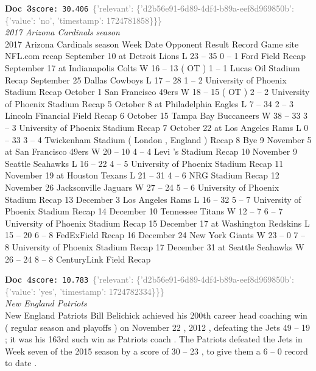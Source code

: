 \documentclass[a4paper,11pt]{article}
\begin{document}
\begin{docenv}
{\footnotesize\textcolor{doccolor}{\textbf{Doc~3}}}\hfill{\tiny\texttt{score:~30.406}}\ {\tiny\textcolor{gray}{\{'relevant': \{'d2b56e91-6d89-4df4-b89a-eef8d969850b': \{'value': 'no', 'timestamp': 1724781858\}\}\}}}\\[3pt]
{\small\textit{2017 Arizona Cardinals season}}\\[2pt]
\vspace{2pt}
{\footnotesize 2017 Arizona Cardinals season
Week Date Opponent Result Record Game site NFL.com recap September 10 at Detroit Lions L 23 -- 35 0 -- 1 Ford Field Recap September 17 at Indianapolis Colts W 16 -- 13 ( OT ) 1 -- 1 Lucas Oil Stadium Recap September 25 Dallas Cowboys L 17 -- 28 1 -- 2 University of Phoenix Stadium Recap October 1 San Francisco 49ers W 18 -- 15 ( OT ) 2 -- 2 University of Phoenix Stadium Recap 5 October 8 at Philadelphia Eagles L 7 -- 34 2 -- 3 Lincoln Financial Field Recap 6 October 15 Tampa Bay Buccaneers W 38 -- 33 3 -- 3 University of Phoenix Stadium Recap 7 October 22 at Los Angeles Rams L 0 -- 33 3 -- 4 Twickenham Stadium ( London , England ) Recap 8 Bye 9 November 5 at San Francisco 49ers W 20 -- 10 4 -- 4 Levi 's Stadium Recap 10 November 9 Seattle Seahawks L 16 -- 22 4 -- 5 University of Phoenix Stadium Recap 11 November 19 at Houston Texans L 21 -- 31 4 -- 6 NRG Stadium Recap 12 November 26 Jacksonville Jaguars W 27 -- 24 5 -- 6 University of Phoenix Stadium Recap 13 December 3 Los Angeles Rams L 16 -- 32 5 -- 7 University of Phoenix Stadium Recap 14 December 10 Tennessee Titans W 12 -- 7 6 -- 7 University of Phoenix Stadium Recap 15 December 17 at Washington Redskins L 15 -- 20 6 -- 8 FedExField Recap 16 December 24 New York Giants W 23 -- 0 7 -- 8 University of Phoenix Stadium Recap 17 December 31 at Seattle Seahawks W 26 -- 24 8 -- 8 CenturyLink Field Recap}
\end{docenv}
\begin{docenv}
{\footnotesize\textcolor{doccolor}{\textbf{Doc~4}}}\hfill{\tiny\texttt{score:~10.783}}\ {\tiny\textcolor{gray}{\{'relevant': \{'d2b56e91-6d89-4df4-b89a-eef8d969850b': \{'value': 'yes', 'timestamp': 1724782334\}\}\}}}\\[3pt]
{\small\textit{New England Patriots}}\\[2pt]
\vspace{2pt}
{\footnotesize New England Patriots
Bill Belichick achieved his 200th career head coaching win ( regular season and playoffs ) on November 22 , 2012 , defeating the Jets 49 -- 19 ; it was his 163rd such win as Patriots coach . The Patriots defeated the Jets in Week seven of the 2015 season by a score of 30 -- 23 , to give them a 6 -- 0 record to date .}
\end{docenv}
\end{document}
